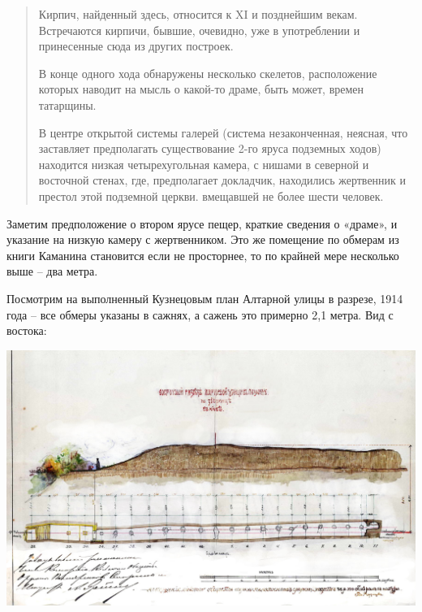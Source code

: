 \begin{quotation}
Кирпич, найденный здесь, относится к XI и позднейшим векам. Встречаются кирпичи, бывшие, очевидно, уже в употреблении и принесенные сюда из других построек. 

В конце одного хода обнаружены несколько скелетов, расположение которых наводит на мысль о какой-то драме, быть может, времен татарщины.

В центре открытой системы галерей (система незаконченная, неясная, что заставляет предполагать существование 2-го яруса подземных ходов) находится низкая четырехугольная камера, с нишами в северной и восточной стенах, где, предполагает докладчик, находились жертвенник и престол этой подземной церкви. вмещавшей не более шести человек.
\end{quotation}

Заметим предположение о втором ярусе пещер, краткие сведения о «драме», и указание на низкую камеру с жертвенником. Это же помещение по обмерам из книги Каманина становится если не просторнее, то по крайней мере несколько выше – два метра.

Посмотрим на выполненный Кузнецовым план Алтарной улицы в разрезе, 1914 года – все обмеры указаны в сажнях, а сажень это примерно 2,1 метра. Вид с востока:

\newpage

\vspace*{\fill}

\begin{center}
\includegraphics[width=\linewidth]{chast-colebanie-osnov/nachalo/1914-01.jpg}
\end{center}

\vspace*{\fill}


